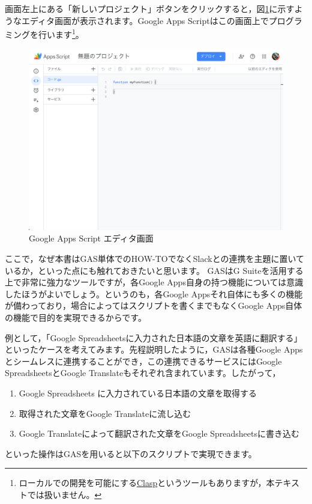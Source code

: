 \documentclass[uplatex,a4j]{jsarticle}
\begin{document}
画面左上にある「新しいプロジェクト」ボタンをクリックすると，図\ref{fig:gas_edit}に示すようなエディタ画面が表示されます。Google Apps Scriptはこの画面上でプログラミングを行います\footnote{ローカルでの開発を可能にする\href{https://github.com/google/clasp}{Clasp}というツールもありますが，本テキストでは扱いません。}。

\begin{figure}[H]
 \centering
 \includegraphics[keepaspectratio, scale=0.4]{images/gas_edit.png}
 \caption{Google Apps Script エディタ画面}
 \label{fig:gas_edit}
\end{figure}


ここで，なぜ本書はGAS単体でのHOW-TOでなくSlackとの連携を主題に置いているか，といった点にも触れておきたいと思います。
GASはG Suiteを活用する上で非常に強力なツールですが，各Google Apps自身の持つ機能については意識したほうがよいでしょう。というのも，各Google Appsそれ自体にも多くの機能が備わっており，場合によってはスクリプトを書くまでもなくGoogle Apps自体の機能で目的を実現できるからです。

例として，「Google Spreadsheetsに入力された日本語の文章を英語に翻訳する」といったケースを考えてみます。先程説明したように，GASは各種Google Appsとシームレスに連携することができ，この連携できるサービスにはGoogle SpreadsheetsとGoogle Translateもそれぞれ含まれています。したがって，
\begin{enumerate}
\item Google Spreadsheets に入力されている日本語の文章を取得する
\item 取得された文章をGoogle Translateに流し込む
\item Google Translateによって翻訳された文章をGoogle Spreadsheetsに書き込む
\end{enumerate}
といった操作はGASを用いると以下のスクリプトで実現できます。
\end{document}
